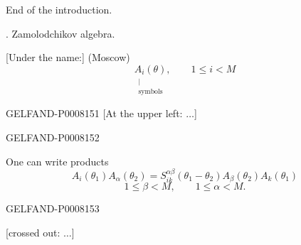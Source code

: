 End of the introduction.

. Zamolodchikov algebra.

[Under the name:] (Moscow)
\[
\underset{\substack{\vert\\\text{symbols}}}{A_i(\theta)},\qquad 1\le i<M
\]


\begin{GelfandAdjacentEvidence}{GELFAND-P000815}{1}
[At the upper left: \(\ldots\)]
\end{GelfandAdjacentEvidence}
\begin{GelfandAdjacentEvidence}{GELFAND-P000815}{2}


One can write products
\begin{equation*}
A_i(\theta_1)A_\alpha(\theta_2)
=S_{ik}^{\alpha\beta}(\theta_1-\theta_2)A_\beta(\theta_2)A_k(\theta_1)\tag{15}
\end{equation*}
\[
1\le\beta<M,\qquad 1\le\alpha<M.
\]
\end{GelfandAdjacentEvidence}
\begin{GelfandAdjacentEvidence}{GELFAND-P000815}{3}


[crossed out: \(\ldots\)]
\end{GelfandAdjacentEvidence}

